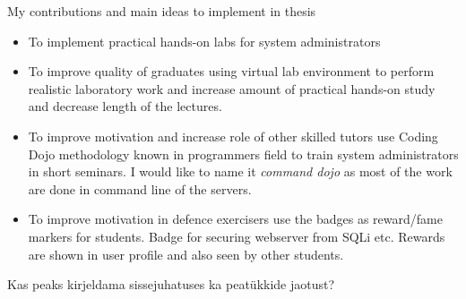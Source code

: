 {\large My contributions and main ideas to implement in thesis}
\begin{itemize}
\item To implement practical hands-on labs for system administrators
\item To improve quality of graduates using virtual lab environment  to perform realistic laboratory work and increase amount of practical hands-on study and decrease length of the lectures.
\item To improve motivation and increase role of other skilled tutors use \gls{Coding Dojo} methodology known in programmers field to train system administrators in short seminars. I would like to name it \emph{ command dojo} as most of the work are done in command line of the servers.
\item To improve motivation in defence exercisers use the badges as reward/fame markers for students. Badge for securing webserver from SQLi etc. Rewards are shown in user profile and also seen by other students.
\end{itemize}
\par
{\color{red} Kas peaks kirjeldama sissejuhatuses ka peatükkide jaotust? }
 
